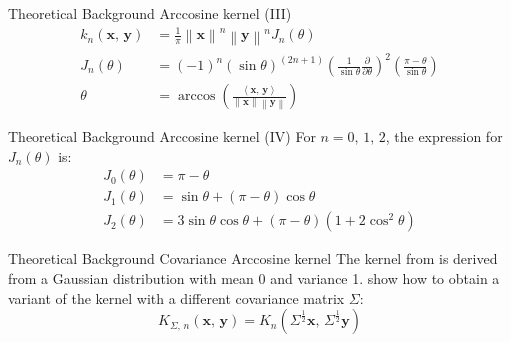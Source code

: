 \documentclass[aspectratio=169]{beamer}
\newcommand{\y}{{\boldsymbol{y}}}
\begin{document}
\begin{frame}{Theoretical Background \textendash{} Arccosine kernel (III)}
	\begin{align}
		k_n(\boldsymbol x,\,\y) & = \frac{1}{\pi} \left\lVert \boldsymbol x \right\rVert^n \left\lVert \y \right\rVert^n J_n(\theta)                                                \\[1em]
		J_n(\theta)             & = (-1)^n \left( \sin \theta \right)^{(2n+1)}
		\left( \frac{1}{\sin \theta} \frac{\partial}{\partial \theta} \right)^2
		\left( \frac{\pi - \theta}{\sin \theta} \right)
		\\
		\theta                  & = \arccos \left( \frac{\left\langle \boldsymbol x,\,\y \right\rangle}{\left\lVert \boldsymbol x \right\rVert \left\lVert \y \right\rVert} \right)
	\end{align}
\end{frame}
\begin{frame}{Theoretical Background \textendash{} Arccosine kernel (IV)}
	For $n = 0,\,1,\,2$, the expression for $J_n(\theta)$ is:
	\begin{align}
		J_0(\theta) & = \pi - \theta                                                                     \\
		J_1(\theta) & = \sin\theta + \left(\pi - \theta\right)\cos\theta               \label{eq:cho_j1} \\
		J_2(\theta) & = 3\sin\theta\cos\theta + \left(\pi - \theta\right)\left(1 + 2\cos^2\theta\right)
	\end{align}
\end{frame}

\begin{frame}{Theoretical Background \textendash{} Covariance Arccosine kernel}
	The kernel from \textcite{choLargemarginClassificationInfinite2010} is derived
	from a Gaussian distribution with mean 0 and variance 1.
	\textcite{pandeyGoDeepWide2014} show how to obtain a variant of the kernel
	with a different covariance matrix $\Sigma$:
	\begin{equation}\label{eq:kernel_pandey}
		K_{\Sigma,\,n}(\boldsymbol x,\,\y) = K_{n}\left(\Sigma^{\frac{1}{2}}\boldsymbol x,\,\Sigma^{\frac{1}{2}}\y\right)
	\end{equation}
\end{frame}
\end{document}
